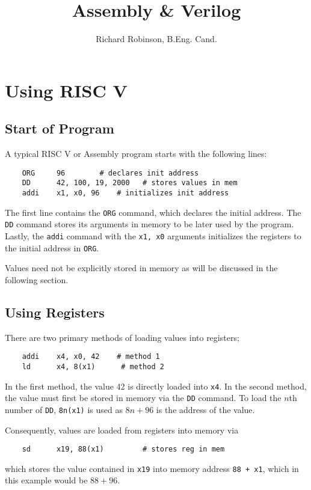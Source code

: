 \documentclass[oneside,11pt]{book}
\title{\Huge{\textbf{Assembly \& Verilog}}}
\author{Richard Robinson, B.Eng. Cand.}
\begin{document}
\maketitle
\setlength{\parindent}{0pt}

\chapter{Using RISC V}

\section{Start of Program}

A typical RISC V or Assembly program starts with the following lines:
\begin{verbatim}
	ORG     96		  # declares init address
	DD      42, 100, 19, 2000   # stores values in mem
	addi    x1, x0, 96	  # initializes init address
\end{verbatim}
The first line contains the \verb$ORG$ command, which declares the initial address. The \verb$DD$ command stores its arguments in memory to be later used by the program. Lastly, the \verb$addi$ command with the \verb$x1, x0$ arguments initializes the registers to the initial address in \verb$ORG$.

\bigskip
Values need not be explicitly stored in memory as will be discussed in the following section.

\section{Using Registers}
There are two primary methods of loading values into registers;
\begin{verbatim}
	addi    x4, x0, 42	  # method 1
	ld      x4, 8(x1)	   # method 2
\end{verbatim}
In the first method, the value 42 is directly loaded into \verb|x4|. In the second method, the value must first be stored in memory via the \verb$DD$ command. To load the $n$th number of \verb$DD$, \verb$8n(x1)$ is used as $8n + 96$ is the address of the value.

\bigskip
Consequently, values are loaded from registers into memory via
\begin{verbatim}
	sd      x19, 88(x1)         # stores reg in mem
\end{verbatim}
which stores the value contained in \verb$x19$ into memory address \verb|88 + x1|, which in this example would be $88 + 96$.
\end{document}
